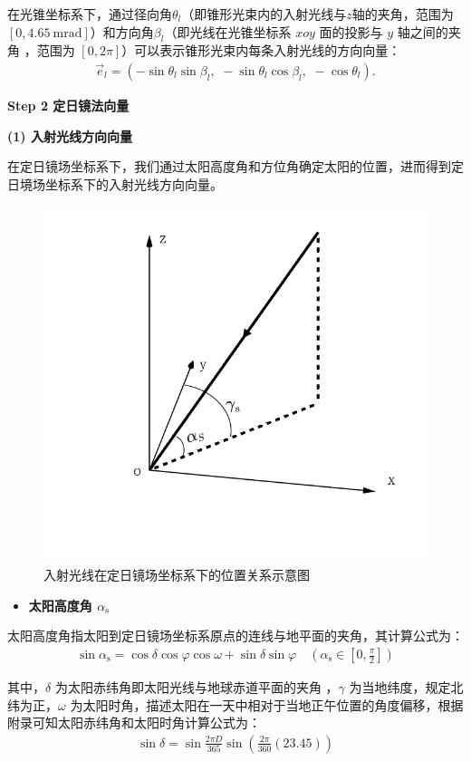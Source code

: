 \documentclass[../main.tex]{subfiles}
\begin{document}
在光锥坐标系下，通过径向角$\theta _l$（即锥形光束内的入射光线与$z$轴的夹角，范围为 \([0, 4.65\ \mathrm{mrad}]\)）和方向角$\beta _l$（即光线在光锥坐标系 \( xoy \) 面的投影与 \( y\) 轴之间的夹角 ，范围为 \([0, 2\pi]\)）可以表示锥形光束内每条入射光线的方向向量：  
\begin{align}    \label{1.3}
\vec{e}_l=\left( -\sin \theta _l\sin \beta _l,\,\,-\sin \theta _l\cos \beta _l,\,\,-\cos \theta _l \right) .
\end{align} 

\noindent \textbf{Step 2 定日镜法向量}
\par \textbf{(1) 入射光线方向向量}
\par 在定日镜场坐标系下，我们通过太阳高度角和方位角确定太阳的位置，进而得到定日境场坐标系下的入射光线方向向量。
\begin{figure}[H]
\centering
\includegraphics[width=.6\textwidth]{3}
\caption{入射光线在定日镜场坐标系下的位置关系示意图}
\label{1.2}
\end{figure} 
\begin{itemize}
\item \textbf{太阳高度角 $\alpha_{\text{s}}$}
\end{itemize}
\par 太阳高度角指太阳到定日镜场坐标系原点的连线与地平面的夹角，其计算公式为：
\begin{align}    \label{1.4}
\sin \alpha _{\text{s}}=\cos \delta \cos \varphi \cos \omega +\sin \delta \sin \varphi \quad \left( \alpha _{\text{s}}\in \left[ 0,\frac{\pi}{2} \right] \right) 
\end{align}
\par 其中，$\delta$ 为太阳赤纬角即太阳光线与地球赤道平面的夹角 ，$\gamma$ 为当地纬度，规定北纬为正，$\omega$ 为太阳时角，描述太阳在一天中相对于当地正午位置的角度偏移，根据附录可知太阳赤纬角和太阳时角计算公式为：
\begin{align}    \label{1.5}
\sin\delta = \sin\frac{2\pi D}{365} \sin\left(\frac{2\pi}{360}(23.45)\right)
\end{align}
\end{document}
